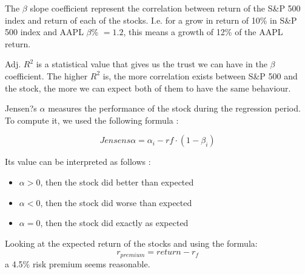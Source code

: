 \documentclass[a4paper,11pt,twoside]{article}
\begin{document}
The $\beta$ slope coefficient represent the correlation between return of the S\&P 500 index and return of each of the stocks. I.e. for a grow in return of 10\% in S\&P 500 index and AAPL $\beta$\% $=1.2$, this means a growth of 12\% of the AAPL return.

Adj. $R^2$ is a statistical value that gives us the trust we can have in the $\beta$ coefficient. The higher $R^2$ is, the more correlation exists between S\&P 500 and the stock, the more we can expect both of them to have the same behaviour.

Jensen?s $\alpha$ measures the performance of the stock during the regression period. To compute it, we used the following formula :

$$Jensens \alpha = \alpha_i - rf \cdot (1 - \beta_i) $$

Its value can be interpreted as follows :
\begin{itemize}
\item $\alpha > 0$, then the stock did better than expected
\item $\alpha < 0$, then the stock did worse than expected
\item $\alpha = 0$, then the stock did exactly as expected
\end{itemize}

Looking at the expected return of the stocks and using the formula:
$$r_{premium} = return - r_f$$
a 4.5\% risk premium seems reasonable.







\end{document}
